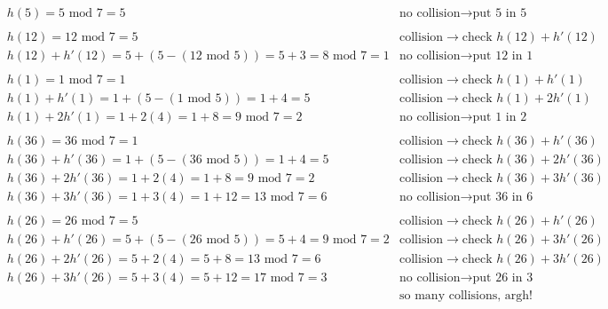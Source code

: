 \documentclass[12pt]{article}
\begin{document}
    \begin{align*}
    &h(5) = 5 \text{ mod } 7 = 5 &\text{no collision} \rightarrow \text{put 5 in 5}\\\\
    &h(12) = 12  \text{ mod } 7 = 5 &\text{collision} \rightarrow \text{check } h(12)+h'(12)\\
    &h(12) + h'(12) = 5 + (5 - (12 \text{ mod } 5)) = 5+3 = 8 \text{ mod } 7= 1 &\text{no collision} \rightarrow \text{put 12 in 1}\\\\
    &h(1) = 1 \text{ mod } 7 = 1 &\text{collision} \rightarrow \text{check } h(1)+h'(1)\\
    &h(1) + h'(1) = 1 + (5-(1 \text{ mod } 5)) = 1+4 = 5 &\text{collision} \rightarrow \text{check } h(1)+2h'(1)\\
    &h(1) + 2h'(1) = 1 + 2(4) = 1+8 = 9 \text{ mod } 7 = 2 &\text{no collision} \rightarrow \text{put 1 in 2}\\\\
    &h(36) = 36 \text{ mod } 7 = 1 &\text{collision} \rightarrow \text{check } h(36)+h'(36)\\
    &h(36) + h'(36) = 1 + (5 - (36 \text{ mod } 5)) = 1+4 = 5 &\text{collision} \rightarrow \text{check } h(36)+2h'(36)\\
    &h(36) + 2h'(36) = 1 + 2(4) = 1+ 8 = 9 \text{ mod } 7 = 2 &\text{collision} \rightarrow \text{check } h(36)+3h'(36)\\
    &h(36) + 3h'(36) = 1 + 3(4) = 1+12 = 13\text{ mod } 7 = 6 &\text{no collision} \rightarrow \text{put 36 in 6}\\\\
    &h(26) = 26 \text{ mod } 7 = 5 &\text{collision} \rightarrow \text{check } h(26)+h'(26)\\
    &h(26) + h'(26) = 5 + (5-(26 \text{ mod } 5)) = 5+4 = 9 \text{ mod } 7 = 2 &\text{collision} \rightarrow \text{check } h(26)+3h'(26)\\
    &h(26) + 2h'(26) = 5 + 2(4) = 5+8 = 13 \text{ mod } 7 = 6 &\text{collision} \rightarrow \text{check } h(26)+3h'(26)\\
    &h(26) + 3h'(26) = 5 + 3(4) = 5+12 = 17\text{ mod } 7 = 3 &\text{no collision} \rightarrow \text{put 26 in 3}\\
    &&\text{so many collisions, argh!}
    \end{align*}

    \pagebreak
\end{document}
